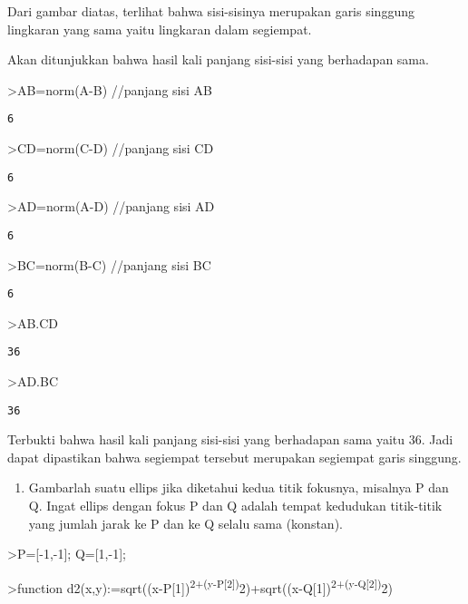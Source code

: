 \documentclass[
]{book}
\providecommand{\tightlist}{%
  \setlength{\itemsep}{0pt}\setlength{\parskip}{0pt}}
\begin{document}
Dari gambar diatas, terlihat bahwa sisi-sisinya merupakan garis singgung lingkaran yang sama yaitu lingkaran dalam segiempat.

Akan ditunjukkan bahwa hasil kali panjang sisi-sisi yang berhadapan sama.

\textgreater AB=norm(A-B) //panjang sisi AB

\begin{verbatim}
6
\end{verbatim}

\textgreater CD=norm(C-D) //panjang sisi CD

\begin{verbatim}
6
\end{verbatim}

\textgreater AD=norm(A-D) //panjang sisi AD

\begin{verbatim}
6
\end{verbatim}

\textgreater BC=norm(B-C) //panjang sisi BC

\begin{verbatim}
6
\end{verbatim}

\textgreater AB.CD

\begin{verbatim}
36
\end{verbatim}

\textgreater AD.BC

\begin{verbatim}
36
\end{verbatim}

Terbukti bahwa hasil kali panjang sisi-sisi yang berhadapan sama yaitu 36. Jadi dapat dipastikan bahwa segiempat tersebut merupakan segiempat garis singgung.

\begin{enumerate}
\def\labelenumi{\arabic{enumi}.}
\setcounter{enumi}{3}
\tightlist
\item
  Gambarlah suatu ellips jika diketahui kedua titik fokusnya, misalnya P dan Q. Ingat ellips dengan fokus P dan Q adalah tempat kedudukan titik-titik yang jumlah jarak ke P dan ke Q selalu sama (konstan).
\end{enumerate}

\textgreater P={[}-1,-1{]}; Q={[}1,-1{]};

\textgreater function d2(x,y):=sqrt((x-P{[}1{]})\textsuperscript{2+(y-P{[}2{]})}2)+sqrt((x-Q{[}1{]})\textsuperscript{2+(y-Q{[}2{]})}2)
\end{document}
